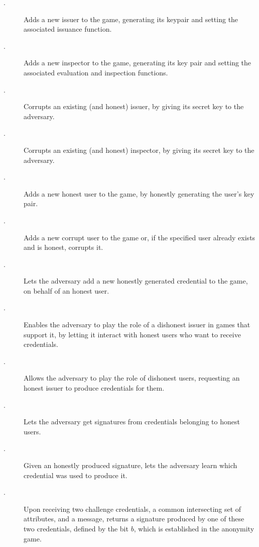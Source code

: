 \begin{description}
\item[\IGEN.] Adds a new issuer to the game, generating its keypair and setting
  the associated issuance function.
\item[\OGEN.] Adds a new inspector to the game, generating its key pair and
  setting the associated evaluation and inspection functions.
\item[\ICORR.] Corrupts an existing (and honest) issuer, by giving its secret
  key to the adversary.
\item[\OCORR.] Corrupts an existing (and honest) inspector, by giving its secret
  key to the adversary.  
\item[\HUGEN.] Adds a new honest user to the game, by honestly generating
  the user's key pair.
\item[\CUGEN.] Adds a new corrupt user to the game or, if the specified
  user already exists and is honest, corrupts it.
\item[\OBTISS.] Lets the adversary add a new honestly generated credential to
  the game, on behalf of an honest user.
\item[\OBTAIN.] Enables the adversary to play the role of a dishonest issuer
  in games that support it, by letting it interact with honest users who want to
  receive credentials.
\item[\ISSUE.] Allows the adversary to play the role of dishonest users,
  requesting an honest issuer to produce credentials for them.
\item[\SIGN.] Lets the adversary get signatures from credentials belonging
  to honest users.
\item[\OPEN.] Given an honestly produced signature, lets the adversary learn
  which credential was used to produce it.
\item[\CHALb.] Upon receiving two challenge credentials, a common intersecting
  set of attributes, and a message, returns a signature produced by one of these
  two credentials, defined by the bit $b$, which is established in the anonymity
  game.
\end{description}

